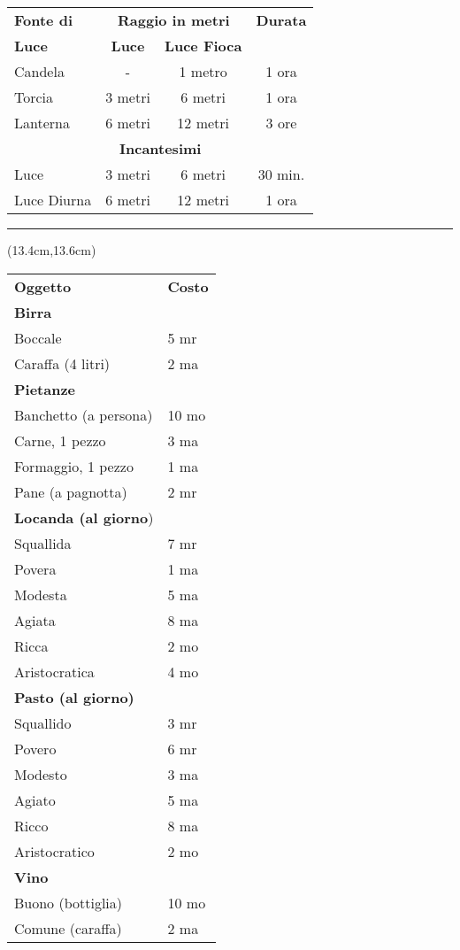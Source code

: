 \documentclass[a4paper,12 pt,openany]{book}
\newcommand{\riga}{\rule{\textwidth}{0.4pt}}
\begin{document}
\begin{textblock*}{12cm}
\begin{tabular}{l|cc|c}
\textbf{Fonte di} &\multicolumn{2}{c}{\textbf{Raggio in metri}}& \textbf{Durata}  \\
\textbf{Luce}& \textbf{Luce} & \textbf{Luce Fioca} &\\
Candela  & - & 1 metro  & 1 ora\\
Torcia & 3 metri & 6 metri  & 1 ora\\
Lanterna & 6 metri & 12 metri  & 3 ore \\
\multicolumn{4}{c}{\textbf{Incantesimi}}\\
Luce 		 & 3 metri & 6 metri  &30 min. \\
Luce Diurna  & 6 metri & 12 metri & 1 ora \\
\end{tabular}
	


\riga

\end{textblock*}

\begin{textblock*}{6cm}(13.4cm,13.6cm) %

\begin{tabular}{ll}
\textbf{Oggetto}&\textbf{Costo}\\
\textbf{Birra}&\\
Boccale&5 mr\\
Caraffa (4 litri)&2 ma\\
\textbf{Pietanze} &\\
Banchetto (a persona)&10 mo\\
Carne, 1 pezzo&3 ma\\
Formaggio, 1 pezzo&1 ma\\
Pane (a pagnotta)&2 mr\\
\textbf{Locanda (al giorno})&\\
Squallida&7 mr\\
Povera&1 ma\\
Modesta&5 ma\\
Agiata&8 ma\\
Ricca&2 mo\\
Aristocratica&4 mo\\
\textbf{Pasto (al giorno)}&\\
Squallido&3 mr\\
Povero&6 mr\\
Modesto&3 ma\\
Agiato&5 ma\\
Ricco&8 ma\\
Aristocratico&2 mo\\
\textbf{Vino}&\\
Buono (bottiglia)&10 mo\\
Comune (caraffa)&2 ma\\
\end{tabular}

\end{textblock*}
\end{document}
